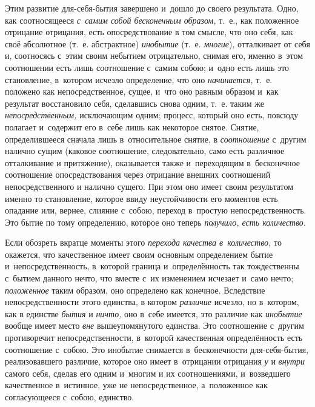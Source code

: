 Этим развитие для-себя-бытия завершено и~дошло до своего результата. Одно,
как соотносящееся {\em с~самим собой бесконечным
образом,} т.~е., как положенное отрицание отрицания, есть опосредствование
в том смысле, что оно себя, как своё абсолютное (т.~е. абстрактное)
{\em инобытие} (т.~е. {\em многие}), отталкивает от себя и, соотносясь с~этим
своим небытием отрицательно, снимая его, именно в~этом соотношении есть
лишь соотношение с~самим собою; и~одно есть лишь это становление, в~котором
исчезло определение, что оно {\em начинается,} т.~е.
положено как непосредственное, сущее, и~что оно равным образом и~как
результат восстановило себя, сделавшись снова одним, т.~е. таким же
{\em непосредственным,} исключающим одним; процесс,
который оно есть, повсюду полагает и~содержит его в~себе лишь как некоторое
снятое. Снятие, определившееся сначала лишь в~относительное снятие, в
{\em соотношение} с~другим налично сущим (каковое
соотношение, следовательно, само есть различное отталкивание и
притяжение), оказывается также и~переходящим в~бесконечное соотношение
опосредствования через отрицание внешних соотношений непосредственного и
налично сущего. При этом оно имеет своим результатом именно то становление,
которое ввиду неустойчивости его моментов есть опадание или, вернее,
слияние с~собою, переход в~простую непосредственность. Это бытие по тому
определению, которое оно теперь {\em получило, есть количество}.

Если обозреть вкратце моменты этого {\em перехода
качества в~количество,} то окажется, что качественное имеет своим основным
определением бытие и~непосредственность, в~которой граница и~определённость
так тождественны с~бытием данного нечто, что вместе с~их изменением
исчезает и~само нечто; {\em положенное} таким образом,
оно определено как конечное. Вследствие непосредственности этого единства,
в котором {\em различие} исчезло, но в~котором, как в
единстве {\em бытия} и {\em ничто,}
оно в~себе имеется, это различие как {\em инобытие}
вообще имеет место {\em вне} вышеупомянутого единства.
Это соотношение с~другим противоречит непосредственности, в~которой
качественная определённость есть соотношение с~собою. Это инобытие
снимается в~бесконечности для-себя-бытия, реализовавшего различие, которое
оно имеет в~отрицании отрицания {\em у} и
{\em внутри} самого себя, сделав его одним и~многим и
их соотношениями, и~возведшего качественное в~истинное, уже не
непосредственное, а~положенное как согласующееся с~собою, единство.

